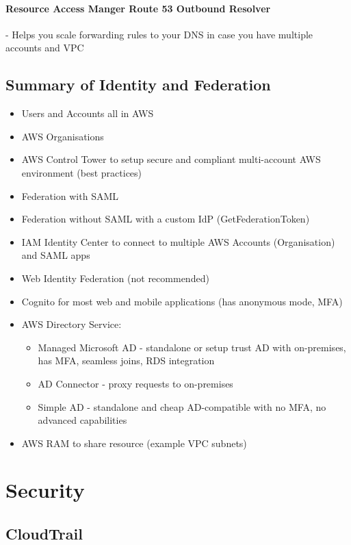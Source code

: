 \documentclass[11pt]{book}
\begin{document}
    \subsubsection{Resource Access Manger Route 53 Outbound Resolver}
    - Helps you scale forwarding rules to your DNS in case you have multiple accounts and VPC


    \section{Summary of Identity and Federation}

    \begin{itemize}
        \item Users and Accounts all in AWS
        \item AWS Organisations
        \item AWS Control Tower to setup secure and compliant multi-account AWS environment (best practices)
        \item Federation with SAML
        \item Federation without SAML with a custom IdP (GetFederationToken)
        \item IAM Identity Center to connect to multiple AWS Accounts (Organisation) and SAML apps
        \item Web Identity Federation (not recommended)
        \item Cognito for most web and mobile applications (has anonymous mode, MFA)
        \item AWS Directory Service:
        \begin{itemize}
            \item Managed Microsoft AD - standalone or setup trust AD with on-premises, has MFA, seamless joins, RDS integration
            \item AD Connector - proxy requests to on-premises
            \item Simple AD - standalone and cheap AD-compatible with no MFA, no advanced capabilities
        \end{itemize}
        \item AWS RAM to share resource (example VPC subnets)
    \end{itemize}


    \chapter{Security}


    \section{CloudTrail}
\end{document}
